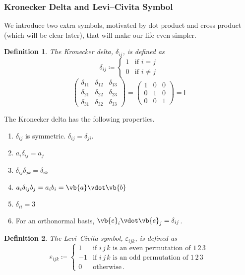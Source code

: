 \documentclass{article}
\theoremstyle{plain}\theoremheaderfont{\normalfont\itshape}\theorembodyfont{\rmfamily}\theoremseparator{.}\newtheorem*{rem}{Remark}\newtheorem*{ex}{Example}\newtheorem*{proof}{Proof}\newtheorem*{altp}{Alternative proof}
\theoremstyle{plain}\theoremheaderfont{\normalfont\bfseries}\theorembodyfont{\rmfamily}\theoremseparator{.}\newtheorem{thm}{Theorem}[section]\newtheorem{lem}[thm]{Lemma}\newtheorem{prop}[thm]{Proposition}\newtheorem*{cor}{Corollary}\newtheorem{defn}[thm]{Definition}\newtheorem{clm}[thm]{Claim}\newtheorem{clminproof}{Claim}
\theoremstyle{break}\theoremheaderfont{\normalfont\itshape}\theorembodyfont{\rmfamily}\theoremseparator{.\medskip}\newtheorem*{proofskip}{Proof}\newtheorem*{exs}{Examples}\newtheorem*{rems}{Remarks}
\theoremstyle{break}\theoremheaderfont{\normalfont\bfseries}\theorembodyfont{\rmfamily}\theoremseparator{.\medskip}\newtheorem{lemskip}[thm]{Lemma}\newtheorem{defnskip}[thm]{Definition}\newtheorem{propskip}[thm]{Proposition}\newtheorem{thmskip}[thm]{Theorem}
\numberwithin{equation}{section}
\begin{document}
	\subsubsection{Kronecker Delta and Levi--Civita Symbol}
	We introduce two extra symbols, motivated by dot product and cross product (which will be clear later), that will make our life even simpler.
	\begin{defn}
		The \textit{Kronecker delta}, \(\delta_{ij}\), is defined as
		\[\delta_{ij}\coloneqq\begin{cases}
			1 & \text{if }i=j\\
			0 & \text{if }i\ne j
		\end{cases}\]
		\[\begin{pmatrix}
			\delta_{11} & \delta_{12} &\delta_{13}\\
			\delta_{21} & \delta_{22} &\delta_{23}\\
			\delta_{31} & \delta_{32} &\delta_{33}
		\end{pmatrix}=\begin{pmatrix}
			1 & 0 & 0\\
			0 & 1 & 0\\
			0 & 0 & 1
		\end{pmatrix}
		=\mathsf{I}\]
	\end{defn}
	The Kronecker delta has the following properties.
	\begin{enumerate}[topsep=0pt]
		\item \(\delta_{ij}\) is symmetric. \(\delta_{ij}=\delta_{ji}\).
		\item \(a_{i}\delta_{ij}=a_{j}\)
		\item \(\delta_{ij}\delta_{jk}=\delta_{ik}\)
		\item \(a_i\delta_{ij}b_j=a_ib_i=\vb{a}\vdot\vb{b}\)
		\item \(\delta_{ii}=3\)
		\item For an orthonormal basis, \(\vb{e}_i\vdot\vb{e}_j=\delta_{ij}\).
	\end{enumerate}

	\begin{defn}
		The \textit{Levi--Civita symbol}, \(\varepsilon_{ijk}\), is defined as
		\[\varepsilon_{ijk}\coloneqq\begin{cases}
			1 & \text{if }i\,j\,k\text{ is an even permutation of }1\,2\,3\\
			-1 & \text{if }i\,j\,k\text{ is an odd permutation of }1\,2\,3\\
			0 & \text{otherwise}\,.
		\end{cases}\]
	\end{defn}
	
\end{document}
